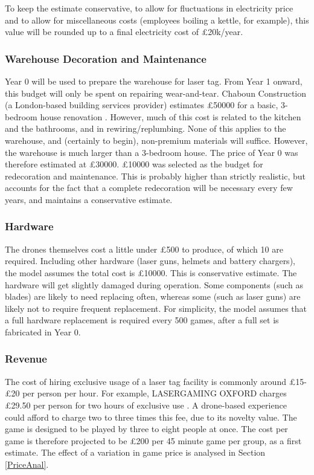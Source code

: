 \documentclass{report_template_oxford}
\begin{document}
\noindent To keep the estimate conservative, to allow for fluctuations in electricity price and to allow for miscellaneous costs (employees boiling a kettle, for example), this value will be rounded up to a final electricity cost of £20k/year.

\subsubsection{Warehouse Decoration and Maintenance}
Year 0 will be used to prepare the warehouse for laser tag. From Year 1 onward, this budget will only be spent on repairing wear-and-tear. Chaboun Construction (a London-based building services provider) estimates £50000 for a basic, 3-bedroom house renovation \cite{chabounconstructionMuchDoes}. However, much of this cost is related to the kitchen and the bathrooms, and in rewiring/replumbing. None of this applies to the warehouse, and (certainly to begin), non-premium materials will suffice. However, the warehouse is much larger than a 3-bedroom house. The price of Year 0 was therefore estimated at £30000. £10000 was selected as the budget for redecoration and maintenance. This is probably higher than strictly realistic, but accounts for the fact that a complete redecoration will be necessary every few years, and maintains a conservative estimate.

\subsubsection{Hardware}
The drones themselves cost a little under £500 to produce, of which 10 are required. Including other hardware (laser guns, helmets and battery chargers), the model assumes the total cost is £10000. This is conservative estimate. The hardware will get slightly damaged during operation. Some components (such as blades) are likely to need replacing often, whereas some (such as laser guns) are likely not to require frequent replacement. For simplicity, the model assumes that a full hardware replacement is required every 500 games, after a full set is fabricated in Year 0.

\subsubsection{Revenue}
The cost of hiring exclusive usage of a laser tag facility is commonly around £15-£20 per person per hour. For example, LASERGAMING OXFORD charges £29.50 per person for two hours of exclusive use \cite{outdoorlaserLasergamingEXCLUSIVE}. A drone-based experience could afford to charge two to three times this fee, due to its novelty value. The game is designed to be played by three to eight people at once. The cost per game is therefore projected to be £200 per 45 minute game per group, as a first estimate. The effect of a variation in game price is analysed in Section \ref{PriceAnal}.
\end{document}
